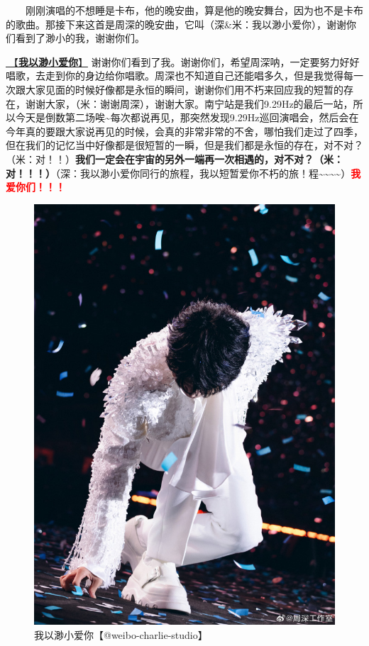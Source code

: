 \documentclass[]{ctexbook}
\begin{document}
  刚刚演唱的不想睡是卡布，他的晚安曲，算是他的晚安舞台，因为也不是卡布的歌曲。那接下来这首是周深的晚安曲，它叫（深\&米：我以渺小爱你），谢谢你们看到了渺小的我，谢谢你们。

\hyperref[loving-you-in-my-humble-way]{🎵【\textbf{我以渺小爱你}】} 谢谢你们看到了我。谢谢你们，希望周深呐，一定要努力好好唱歌，去走到你的身边给你唱歌。周深也不知道自己还能唱多久，但是我觉得每一次跟大家见面的时候好像都是永恒的瞬间，谢谢你们用不朽来回应我的短暂的存在，谢谢大家，（米：谢谢周深），谢谢大家。南宁站是我们9.29Hz的最后一站，所以今天是倒数第二场唉\textasciitilde 每次都说再见，那突然发现9.29Hz巡回演唱会，然后会在今年真的要跟大家说再见的时候，会真的非常非常的不舍，哪怕我们走过了四季，但在我们的记忆当中好像都是很短暂的一瞬，但是我们都是永恒的存在，对不对？（米：对！！）\textbf{我们一定会在宇宙的另外一端再一次相遇的，对不对？（米：对！！！）}（深：我以渺小爱你同行的旅程，我以短暂爱你不朽的旅！程\textasciitilde\textasciitilde\textasciitilde\textasciitilde）\textbf{\textcolor{red}{我爱你们！！！}}

\begin{figure}

{\centering \includegraphics[width=400pt]{img/nanning20241206/005} 

}

\caption{我以渺小爱你【@weibo-charlie-studio】}\label{fig:unnamed-chunk-158}
\end{figure}
\end{document}
